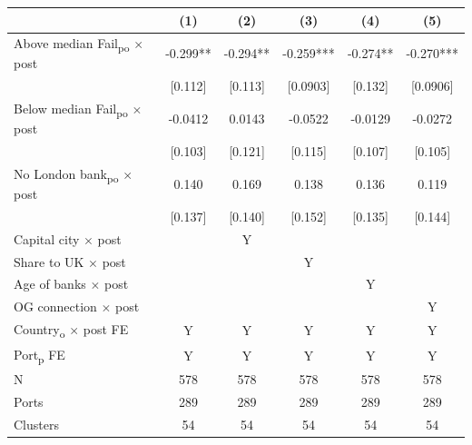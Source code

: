 {
\def\sym#1{\ifmmode^{#1}\else\(^{#1}\)\fi}
\begin{tabular}{l*{5}{c}}
\toprule
            &\multicolumn{1}{c}{(1)}   &\multicolumn{1}{c}{(2)}   &\multicolumn{1}{c}{(3)}   &\multicolumn{1}{c}{(4)}   &\multicolumn{1}{c}{(5)}   \\
\midrule
Above median Fail\textsubscript{po} $\times$ post&      -0.299** &      -0.294** &      -0.259***&      -0.274** &      -0.270***\\
            &     [0.112]   &     [0.113]   &    [0.0903]   &     [0.132]   &    [0.0906]   \\
Below median Fail\textsubscript{po} $\times$ post&     -0.0412   &      0.0143   &     -0.0522   &     -0.0129   &     -0.0272   \\
            &     [0.103]   &     [0.121]   &     [0.115]   &     [0.107]   &     [0.105]   \\
No London bank\textsubscript{po} $\times$ post&       0.140   &       0.169   &       0.138   &       0.136   &       0.119   \\
            &     [0.137]   &     [0.140]   &     [0.152]   &     [0.135]   &     [0.144]   \\
Capital city $\times$ post &               &           Y   &               &               &               \\
Share to UK $\times$ post &               &               &           Y   &               &               \\
Age of banks $\times$ post&               &               &               &           Y   &               \\
OG connection $\times$ post&               &               &               &               &           Y   \\
Country\textsubscript{o} $\times$ post FE&           Y   &           Y   &           Y   &           Y   &           Y   \\
Port\textsubscript{p} FE &           Y   &           Y   &           Y   &           Y   &           Y   \\
\midrule
N           &         578   &         578   &         578   &         578   &         578   \\
Ports       &         289   &         289   &         289   &         289   &         289   \\
Clusters    &          54   &          54   &          54   &          54   &          54   \\
\bottomrule
\end{tabular}
}
